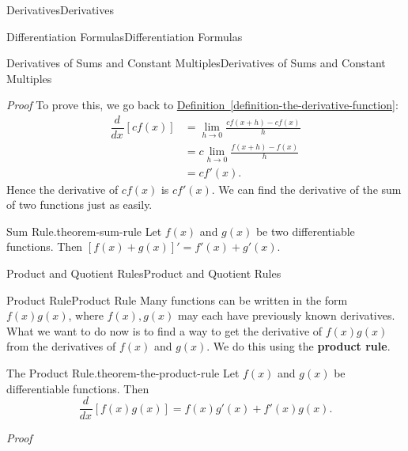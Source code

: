 \documentclass[10pt,]{book}
\makeatletter
\newcommand{\terminology}[1]{\textbf{#1}}
\renewcommand*{\proofname}{Proof}
\renewenvironment{proof}[1][\proofname]{\par
  \pushQED{\qed}%
  \normalfont \topsep6\p@\@plus6\p@\relax
  \trivlist
  \item\relax
    {\itshape
    #1\@addpunct{.}}\hspace\labelsep\ignorespaces
}{%
  \popQED\endtrivlist\@endpefalse
}
\numberwithin{equation}{section}
\newcommand{\dv}[3][]{\dfrac{d^{#1} #2}{d #3^{#1}}}
\makeatother
\begin{document}
\begin{chapterptx}{Derivatives}{}{Derivatives}{}{}
\begin{sectionptx}{Differentiation Formulas}{}{Differentiation Formulas}{}{}
\begin{subsectionptx}{Derivatives of Sums and Constant Multiples}{}{Derivatives of Sums and Constant Multiples}{}{}
\begin{proof}\hypertarget{proof-2}{}
\hypertarget{p-136}{}%
To prove this, we go back to \hyperref[definition-the-derivative-function]{Definition~\ref{definition-the-derivative-function}}:%
\begin{align*}
\dv{}{x}[cf(x)] & = \lim_{h\to0}\frac{cf(x+h) - cf(x)}{h} \\
& = c\lim_{h\to0}\frac{f(x+h) - f(x)}{h} \\
& = cf'(x). 
\end{align*}
Hence the derivative of \(cf(x)\) is \(cf'(x)\).%
\end{proof}
\hypertarget{p-137}{}%
We can find the derivative of the sum of two functions just as easily.%
\begin{theorem}{Sum Rule.}{}{theorem-sum-rule}%
\hypertarget{p-138}{}%
Let \(f(x)\) and \(g(x)\) be two differentiable functions. Then \([f(x)+g(x)]' = f'(x) + g'(x)\).%
\end{theorem}
\end{subsectionptx}
\end{sectionptx}
%
%
\typeout{************************************************}
\typeout{************************************************}
%
\begin{sectionptx}{Product and Quotient Rules}{}{Product and Quotient Rules}{}{}\label{section-product-and-quotient-rules}
%
%
\typeout{************************************************}
\typeout{************************************************}
%
\begin{subsectionptx}{Product Rule}{}{Product Rule}{}{}\label{subsection-product-rule}
\hypertarget{p-139}{}%
Many functions can be written in the form \(f(x)g(x)\), where \(f(x),g(x)\) may each have previously known derivatives. What we want to do now is to find a way to get the derivative of \(f(x)g(x)\) from the derivatives of \(f(x)\) and \(g(x)\). We do this using the \terminology{product rule}.%
\begin{theorem}{The Product Rule.}{}{theorem-the-product-rule}%
\hypertarget{p-140}{}%
Let \(f(x)\) and \(g(x)\) be differentiable functions. Then%
\begin{equation*}
\dv{}{x}[f(x)g(x)] = f(x)g'(x) + f'(x)g(x).
\end{equation*}
%
\end{theorem}
\begin{proof}\hypertarget{proof-3}{}

\end{proof}
\end{subsectionptx}
\end{sectionptx}
\end{chapterptx}
\end{document}
